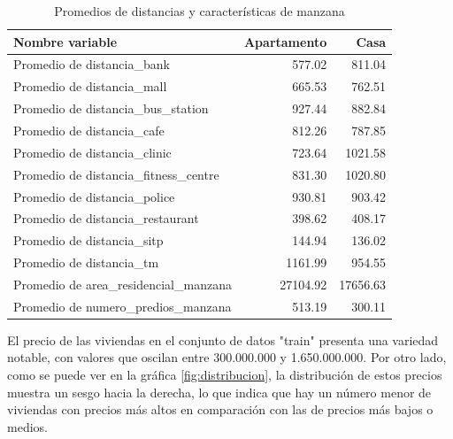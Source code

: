 \documentclass[12pt]{article}
\begin{document}
\begin{table}
\centering
\caption{Promedios de distancias y características de manzana}
\label{tab:promedios_distancias_manzana}
\begin{tabular}{|l|r|r|}
\hline
Nombre variable &  Apartamento &     Casa \\
\hline
Promedio de distancia\_bank           &       577.02 &   811.04 \\
Promedio de distancia\_mall           &       665.53 &   762.51 \\
Promedio de distancia\_bus\_station    &       927.44 &   882.84 \\
Promedio de distancia\_cafe           &       812.26 &   787.85 \\
Promedio de distancia\_clinic         &       723.64 &  1021.58 \\
Promedio de distancia\_fitness\_centre &       831.30 &  1020.80 \\
Promedio de distancia\_police         &       930.81 &   903.42 \\
Promedio de distancia\_restaurant     &       398.62 &   408.17 \\
Promedio de distancia\_sitp           &       144.94 &   136.02 \\
Promedio de distancia\_tm             &      1161.99 &   954.55 \\
Promedio de area\_residencial\_manzana &     27104.92 & 17656.63 \\
Promedio de numero\_predios\_manzana   &       513.19 &   300.11 \\
\hline
\end{tabular}
\end{table}

 El precio de las viviendas en el conjunto de datos "train" presenta una variedad notable, con valores que oscilan entre 300.000.000 y 1.650.000.000. Por otro lado, como se puede ver en la gráfica \ref{fig:distribucion}, la distribución de estos precios muestra un sesgo hacia la derecha, lo que indica que hay un número menor de viviendas con precios más altos en comparación con las de precios más bajos o medios. \\
\end{document}
